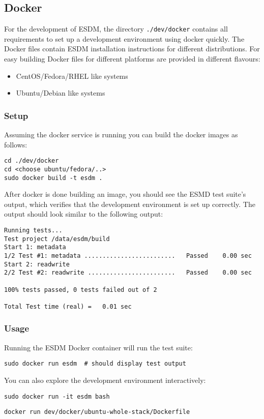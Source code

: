 \subsection{Docker}
For the development of ESDM, the directory \lstinline|./dev/docker| contains all requirements to set up a development environment using docker quickly.
The Docker files contain ESDM installation instructions for different distributions.
For easy building Docker files for different platforms are provided in different flavours:

\begin{itemize}
  \item CentOS/Fedora/RHEL like systems
  \item Ubuntu/Debian like systems
\end{itemize}

\subsubsection{Setup}

Assuming the docker service is running you can build the docker images as follows:

\begin{lstlisting}
cd ./dev/docker
cd <choose ubuntu/fedora/..>
sudo docker build -t esdm .
\end{lstlisting}

After docker is done building an image, you should see the ESMD test suite's output, which verifies that the development environment is set up correctly. 
The output should look similar to the following output:

\begin{lstlisting}
Running tests...
Test project /data/esdm/build
Start 1: metadata
1/2 Test #1: metadata .........................   Passed    0.00 sec
Start 2: readwrite
2/2 Test #2: readwrite ........................   Passed    0.00 sec

100% tests passed, 0 tests failed out of 2

Total Test time (real) =   0.01 sec
\end{lstlisting}


\subsubsection{Usage}
Running the ESDM Docker container will run the test suite:

\begin{lstlisting}
sudo docker run esdm  # should display test output
\end{lstlisting}

You can also explore the development environment interactively:

\begin{lstlisting}
sudo docker run -it esdm bash
\end{lstlisting}

\begin{lstlisting}
docker run dev/docker/ubuntu-whole-stack/Dockerfile
\end{lstlisting}
